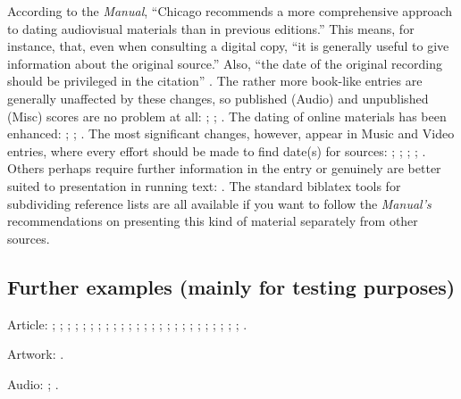 \documentclass[a4paper,12pt]{report}
\begin{document}
According to the \emph{Manual}, \enquote{Chicago recommends a more
  comprehensive approach to dating audiovisual materials than in
  previous editions.}  This means, for instance, that, even when
consulting a digital copy, \enquote{it is generally useful to give
  information about the original source.}  Also, \enquote{the date of
  the original recording should be privileged in the citation}
\autocite[15.53]{chicago:manual}.  The rather more book-like entries
are generally unaffected by these changes, so published
(\textsf{Audio}) and unpublished (\textsf{Misc}) scores are no problem
at all: \autocite{schubert:muellerin}; \autocite{verdi:corsaro};
\autocite{shapey:partita}.  The dating of online materials has been
enhanced: \autocite{coolidge:speech}; \autocite{horowitz:youtube};
\autocite{pollan:plant}.  The most significant changes, however,
appear in \textsf{Music} and \textsf{Video} entries, where every
effort should be made to find date(s) for sources:
\autocite{auden:reading}; \autocite{friends:leia};
\autocite{handel:messiah}; \autocite{holiday:fool};
\autocite{nytrumpet:art}.  Others perhaps require further information
in the entry or genuinely are better suited to presentation in running
text: \autocite{beethoven:sonata29}.  The standard \textsf{biblatex}
tools for subdividing reference lists are all available if you want to
follow the \emph{Manual's} recommendations on presenting this kind of
material separately from other sources.

\subsection*{Further examples (mainly for testing purposes)}
\label{testing}

Article: \autocite{assocpress:gun}; \autocite{brown:bremer};
\autocite{chu:panda}; \autocite{conley:fifthgrade};
\autocite{connell:chronic}; \autocite{ellis:blog};
\autocite{friedman:learning}; \autocite{garaud:gatine};
\autocite{garrett}; \autocite{gibbard}; \autocite{kern};
\autocite{kimluu:diethyl}; \autocite{lewis}; \autocite{loften:hamlet};
\autocite{loomis:structure}; \autocite{morgenson:market};
\autocite{osborne:poison}; \autocite{reaves:rosen};
\autocite{rozner:liberation}; \autocite{schneider:mittelpleistozaene};
\autocite{sewall:letter}; \autocite{stenger:privacy};
\autocite{terborgh:preservation}; \autocite{wall:radio};
\autocite{warr:ellison}; \autocite{white:callimachus}.

Artwork: \autocite{leo:madonna}.

Audio: \autocite{greek:filmstrip}; \autocite{weed:flatiron}.
\end{document}

